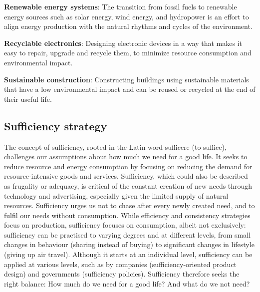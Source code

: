 \documentclass[
  a4paper,
  DIV=11,
  numbers=noendperiod,
  oneside,
  openany]{scrreprt}
\begin{document}
\begin{tcolorbox}[enhanced jigsaw, arc=.35mm, bottomrule=.15mm, bottomtitle=1mm, breakable, colback=white, colbacktitle=quarto-callout-tip-color!10!white, colframe=quarto-callout-tip-color-frame, coltitle=black, left=2mm, leftrule=.75mm, opacityback=0, opacitybacktitle=0.6, rightrule=.15mm, title={Putting Consistency Strategies into Action: Examples}, titlerule=0mm, toprule=.15mm, toptitle=1mm]

\textbf{Renewable energy systems}: The transition from fossil fuels to
renewable energy sources such as solar energy, wind energy, and
hydropower is an effort to align energy production with the natural
rhythms and cycles of the environment.

\textbf{Recyclable electronics}: Designing electronic devices in a way
that makes it easy to repair, upgrade and recycle them, to minimize
resource consumption and environmental impact.

\textbf{Sustainable construction}: Constructing buildings using
sustainable materials that have a low environmental impact and can be
reused or recycled at the end of their useful life.

\end{tcolorbox}

\subsection{Sufficiency strategy}\label{sufficiency-strategy}

The concept of sufficiency, rooted in the Latin word sufficere (to
suffice), challenges our assumptions about how much we need for a good
life. It seeks to reduce resource and energy consumption by focusing on
reducing the demand for resource-intensive goods and services.
Sufficiency, which could also be described as frugality or adequacy, is
critical of the constant creation of new needs through technology and
advertising, especially given the limited supply of natural resources.
Sufficiency urges us not to chase after every newly created need, and to
fulfil our needs without consumption. While efficiency and consistency
strategies focus on production, sufficiency focuses on consumption,
albeit not exclusively: sufficiency can be practised to varying degrees
and at different levels, from small changes in behaviour (sharing
instead of buying) to significant changes in lifestyle (giving up air
travel). Although it starts at an individual level, sufficiency can be
applied at various levels, such as by companies (sufficiency-oriented
product design) and governments (sufficiency policies). Sufficiency
therefore seeks the right balance: How much do we need for a good life?
And what do we not need?
\end{document}
